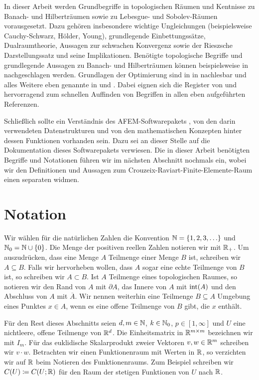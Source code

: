 In dieser Arbeit werden Grundbegriffe in topologischen Räumen und Kentnisse zu
Banach- und Hilberträumen sowie zu Lebesgue- und Sobolev-Räumen vorausgesetzt.
Dazu gehören insbesondere wichtige Ungleichungen (beispielsweise
Cauchy-Schwarz, Hölder, Young), grundlegende Einbettungssätze, Dualraumtheorie,
Aussagen zur schwachen Konvergenz sowie der Rieszsche Darstellungssatz und
seine Implikationen.
Benötigte topologische Begriffe und grundlegende Aussagen zu Banach- und
Hilberträumen können beispielsweise in \cite{Zei86} nachgeschlagen werden.
Grundlagen der Optimierung sind in in \cite{Zei85} nachlesbar und alles Weitere
eben genannte in \cite{Zei90a} und \cite{Zei90b}. 
Dabei eignen sich die Register von \cite{Zei90b} und \cite{Zei85} hervorragend
zum schnellen Auffinden von Begriffen in allen eben aufgeführten
Referenzen.

Schließlich sollte ein Verständnis des AFEM-Softwarepakets \cite{Car09}, von
den darin verwendeten Datenstrukturen und von den mathematischen Konzepten
hinter dessen Funktionen vorhanden sein. 
Dazu sei an dieser Stelle auf die Dokumentation \cite{CGKNRR10} dieses
Softwarepakets verwiesen.
Die in dieser Arbeit benötigten Begriffe und Notationen führen wir im nächsten
Abschnitt nochmals ein, wobei wir den Definitionen und Aussagen zum
Crouzeix-Raviart-Finite-Elemente-Raum einen separaten
 widmen.


\section{Notation}
\label{sec:notation}

Wir wählen für die natürlichen Zahlen die Konvention
$\mathbb{N}=\{1,2,3,\ldots\}$ und $\mathbb{N}_0=\mathbb{N}\cup\{0\}$. 
Die Menge der positiven reellen Zahlen notieren wir mit $\mathbb{R}_+$.
Um auszudrücken, dass eine Menge $A$ Teilmenge einer Menge $B$ ist, schreiben
wir $A\subseteq B$. Falls wir hervorheben wollen, dass $A$ sogar eine echte
Teilmenge von $B$ ist, so schreiben wir $A\subset B$.
Ist $A$ Teilmenge eines topologischen Raumes, so notieren wir den Rand von $A$
mit $\partial A$, das Innere von $A$ mit $\operatorname{int}(A)$ und den Abschluss
von $A$ mit $\overline A$.
Wir nennen weiterhin eine Teilmenge $B\subseteq A$ Umgebung eines Punktes $x\in
A$, wenn es eine offene Teilmenge von $B$ gibt, die $x$ enthält.

Für den Rest dieses Abschnitts seien $d,m\in\mathbb{N}$, $k\in\mathbb{N}_0$,
$p\in[1,\infty]$ und $U$ eine nichtleere, offene Teilmenge von $\mathbb{R}^d$.
Die Einheitsmatrix in $\mathbb{R}^{m\times m}$ bezeichnen wir mit $I_m$.
Für das euklidische Skalarprodukt zweier Vektoren $v,w\in \mathbb{R}^m$ schreiben wir
$v\cdot w$.
Betrachten wir einen Funktionenraum mit Werten in $\mathbb{R}$, so verzichten wir auf
$\mathbb{R}$ beim Notieren des Funktionenraums. Zum Beispiel schreiben wir 
$C(U)\coloneqq C(U;\mathbb{R})$ für den Raum der stetigen Funktionen von $U$ nach
$\mathbb{R}$.

